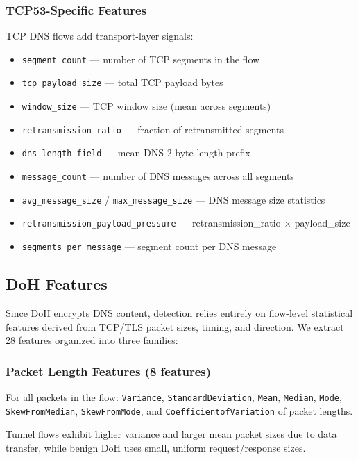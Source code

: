 \documentclass[12pt,a4paper]{article}
\begin{document}
\subsubsection{TCP53-Specific Features}

TCP DNS flows add transport-layer signals:

\begin{itemize}
    \item \texttt{segment\_count} --- number of TCP segments in the flow
    \item \texttt{tcp\_payload\_size} --- total TCP payload bytes
    \item \texttt{window\_size} --- TCP window size (mean across segments)
    \item \texttt{retransmission\_ratio} --- fraction of retransmitted segments
    \item \texttt{dns\_length\_field} --- mean DNS 2-byte length prefix
    \item \texttt{message\_count} --- number of DNS messages across all segments
    \item \texttt{avg\_message\_size} / \texttt{max\_message\_size} --- DNS message size statistics
    \item \texttt{retransmission\_payload\_pressure} --- retransmission\_ratio $\times$ payload\_size
    \item \texttt{segments\_per\_message} --- segment count per DNS message
\end{itemize}

\subsection{DoH Features}

Since DoH encrypts DNS content, detection relies entirely on flow-level statistical features derived from TCP/TLS packet sizes, timing, and direction. We extract 28 features organized into three families:

\subsubsection{Packet Length Features (8 features)}

For all packets in the flow: \texttt{Variance}, \texttt{StandardDeviation}, \texttt{Mean}, \texttt{Median}, \texttt{Mode}, \texttt{SkewFromMedian}, \texttt{SkewFromMode}, and \texttt{CoefficientofVariation} of packet lengths.

Tunnel flows exhibit higher variance and larger mean packet sizes due to data transfer, while benign DoH uses small, uniform request/response sizes.
\end{document}
